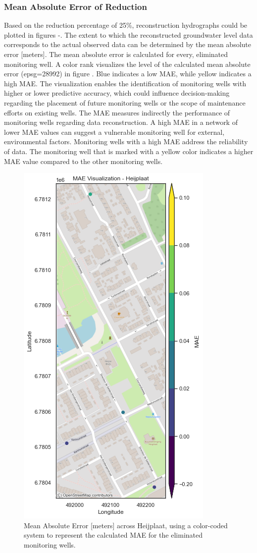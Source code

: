 \clearpage
\subsubsection{Mean Absolute Error of Reduction}
Based on the reduction percentage of 25\%, reconstruction hydrographs could be plotted in figures -. The extent to which the reconstructed groundwater level data corresponds to the actual observed data can be determined by the mean absolute error [meters]. The mean absolute error is calculated for every, eliminated monitoring well. A color rank visualizes the level of the calculated mean absolute error (epsg=28992) in figure . Blue indicates a low MAE, while yellow indicates a high MAE. The visualization enables the identification of monitoring wells with higher or lower predictive accuracy, which could influence decision-making regarding the placement of future monitoring wells or the scope of maintenance efforts on existing wells. The MAE measures indirectly the performance of monitoring wells regarding data reconstruction. A high MAE in a network of lower MAE values can suggest a vulnerable monitoring well for external, environmental factors. Monitoring wells with a high MAE address the reliability of data. The monitoring well that is marked with a yellow color indicates a higher MAE value compared to the other monitoring wells. 

\begin{figure}[htbp]
    \centering
    \includegraphics[width=0.5\linewidth]{frontmatter/Heijplaat-fig/mae25heij.png}
    \caption{Mean Absolute Error [meters] across Heijplaat, using a color-coded system to represent the calculated MAE for the eliminated monitoring wells.}
    \label{maeheij}
\end{figure}
\clearpage

